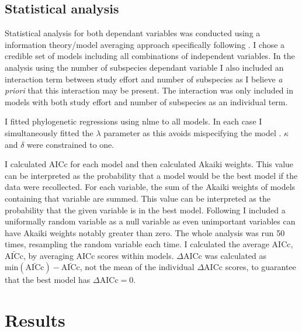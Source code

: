 \subsection{Statistical analysis}

Statistical analysis for both dependant variables was conducted using a information theory/model averaging approach \cite{burnham2002model} specifically following \cite{whittingham2005habitat, whittingham2006we}.
I chose a credible set of models including all combinations of independent variables.
In the analysis using the number of subspecies dependant variable I also included an interaction term between study effort and number of subspecies as I believe \emph{a priori} that this interaction may be present.
The interaction was only included in models with both study effort and number of subspecies as an individual term.

I fitted phylogenetic regressions using nlme \cite{nlme} to all models.
In each case I simultaneously fitted the $\lambda$ parameter as this avoids mispecifying the model \cite{revell2010phylogenetic}.
$\kappa$ and $\delta$ were constrained to one.

I calculated AICc for each model and then calculated Akaiki weights.
This value can be interpreted as the probability that a model would be the best model if the data were recollected.
For each variable, the sum of the Akaiki weights of models containing that variable are summed.
This value can be interpreted as the probability that the given variable is in the best model.
Following \cite{whittingham2005habitat} I included a uniformally random variable as a null variable as even unimportant variables can have Akaiki weights notably greater than zero.
The whole analysis was run 50 times, resampling the random variable each time.
I calculated the average AICc, $\bar{\text{AICc}}$, by averaging AICc scores within models.
$\Delta\text{AICc}$ was calculated as $\text{min}(\bar{\text{AICc}}) - \bar{\text{AICc}}$, not the mean of the individual $\Delta\text{AICc}$ scores, to guarantee that the best model has $\Delta\text{AICc} = 0$.



\section{Results}


